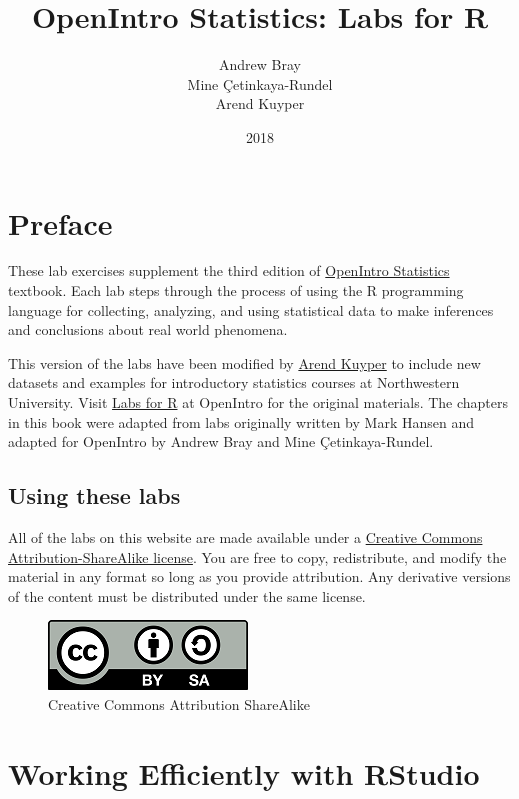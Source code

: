 \documentclass[]{book}
\title{OpenIntro Statistics: Labs for R}
\author{Andrew Bray \\ Mine Çetinkaya-Rundel \\ Arend Kuyper}
\date{2018}
\theoremstyle{definition}
\theoremstyle{definition}
\theoremstyle{definition}
\theoremstyle{remark}
\begin{document}
\maketitle

{
\setcounter{tocdepth}{1}
\tableofcontents
}
\chapter*{Preface}\label{preface}

These lab exercises supplement the third edition of
\href{https://www.openintro.org/stat/index.php}{OpenIntro Statistics}
textbook. Each lab steps through the process of using the R programming
language for collecting, analyzing, and using statistical data to make
inferences and conclusions about real world phenomena.

This version of the labs have been modified by
\href{https://www.statistics.northwestern.edu/people/faculty/arend-m-kuyper.html}{Arend
Kuyper} to include new datasets and examples for introductory statistics
courses at Northwestern University. Visit
\href{https://www.openintro.org/stat/labs.php}{Labs for R} at OpenIntro
for the original materials. The chapters in this book were adapted from
labs originally written by Mark Hansen and adapted for OpenIntro by
Andrew Bray and Mine Çetinkaya-Rundel.

\section{Using these labs}\label{using-these-labs}

All of the labs on this website are made available under a
\href{https://creativecommons.org/licenses/by-sa/3.0/}{Creative Commons
Attribution-ShareAlike license}. You are free to copy, redistribute, and
modify the material in any format so long as you provide attribution.
Any derivative versions of the content must be distributed under the
same license.

\begin{figure}[htbp]
\centering
\includegraphics{./assets/images/by-sa.png}
\caption{Creative Commons Attribution ShareAlike}
\end{figure}

\chapter{Working Efficiently with
RStudio}\label{working-efficiently-with-rstudio}
\end{document}
